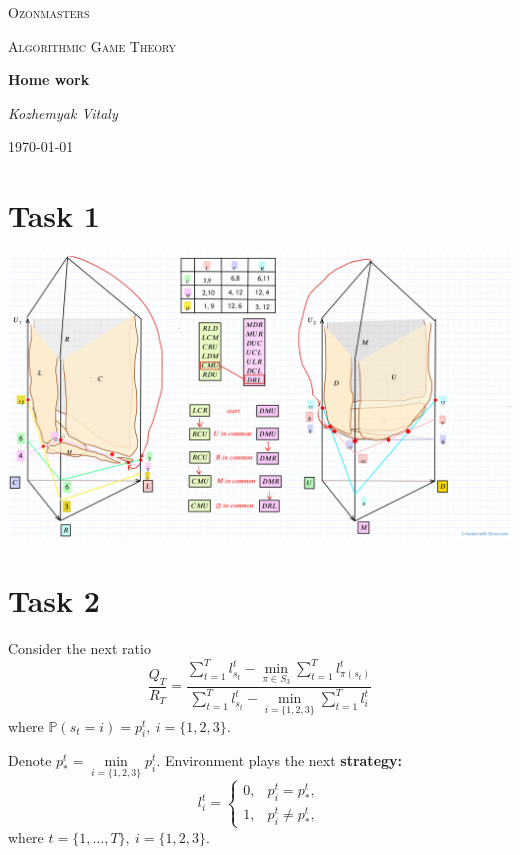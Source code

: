 \documentclass[a4paper, 12pt]{article}
\begin{document}
 

\begin{titlepage}
	\centering
	{\scshape\LARGE Ozonmasters \par}
	\vspace{1cm}
	{\scshape\Large Algorithmic Game Theory \par}
	\vspace{1.5cm}
	{\huge\bfseries Home work \par}
	\vspace{2cm}
	{\Large\itshape Kozhemyak Vitaly \par}
	\vfill

	{\large \today\par}
\end{titlepage}
  
\tableofcontents

\newpage
 
\section{Task 1}
\includegraphics[width=\textwidth]{Images/Task1.png}
\section{Task 2}
Consider the next ratio
$$
\dfrac{Q_T}{R_T} = \dfrac{\sum \limits_{t=1}^T l_{s_t}^t - \min \limits_{\pi \in S_3} \sum \limits_{t=1}^T l_{\pi(s_t)}^t}{\sum \limits_{t=1}^T l_{s_t}^t - \min \limits_{i = \{1, 2, 3 \}} \sum \limits_{t=1}^T l_{i}^t}
$$
where $\mathbb{P}(s_t = i) = p_i^t, ~ i = \{1, 2, 3 \}.$

Denote $p_*^t = \min \limits_{i = \{1, 2, 3 \}} p_i^t.$ Environment plays the next \textbf{strategy:} 
$$
l_{i}^t = 
\begin{cases}
0, & p_i^t = p_*^t, \\
1, & p_i^t \neq p_*^t,
\end{cases}
$$
where $t = \{1, \ldots, T \}, ~ i = \{1, 2, 3 \}.$
\end{document}
